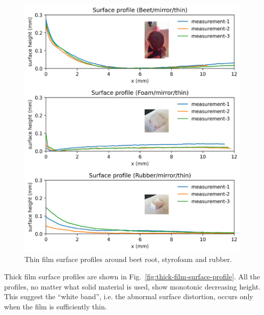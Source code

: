 \documentclass[12pt]{article}
\begin{document}
\begin{figure}
    \centering
    \includegraphics[width=\textwidth]{Figures/surface_profile_measurement_mirror_04042024.pdf}
    \caption{Thin film surface profiles around beet root, styrofoam and rubber.}
    \label{fig:thin-film-surface-profile}
\end{figure}

Thick film surface profiles are shown in Fig.~\ref{fig:thick-film-surface-profile}.
All the profiles, no matter what solid material is used, show monotonic decreasing height. 
This suggest the ``white band'', i.e. the abnormal surface distortion, occurs only when the film is sufficiently thin.
\end{document}
